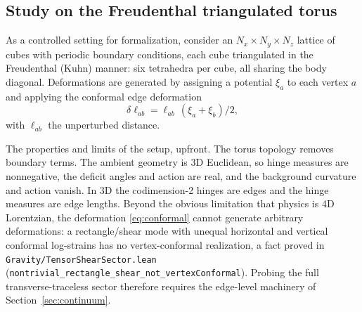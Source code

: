 \documentclass[11pt,letterpaper]{article}
\newcommand{\lean}[1]{\texttt{#1}}
\begin{document}
\subsection{Study on the Freudenthal triangulated torus}
\label{sec:torus}

As a controlled setting for formalization, consider an $N_{x}\times N_{y}\times N_{z}$ lattice of cubes with periodic boundary conditions, each cube triangulated in the Freudenthal (Kuhn) manner: six tetrahedra per cube, all sharing the body diagonal. Deformations are generated by assigning a potential $\xi_{a}$ to each vertex $a$ and applying the conformal edge deformation
\begin{equation}
\delta\ell_{ab}=\ell_{ab}\,(\xi_{a}+\xi_{b})/2,
\label{eq:conformal}
\end{equation}
with $\ell_{ab}$ the unperturbed distance.

The properties and limits of the setup, upfront. The torus topology removes boundary terms. The ambient geometry is 3D Euclidean, so hinge measures are nonnegative, the deficit angles and action are real, and the background curvature and action vanish. In 3D the codimension-2 hinges are edges and the hinge measures are edge lengths. Beyond the obvious limitation that physics is 4D Lorentzian, the deformation \eqref{eq:conformal} cannot generate arbitrary deformations: a rectangle/shear mode with unequal horizontal and vertical conformal log-strains has no vertex-conformal realization, a fact proved in \lean{Gravity/TensorShearSector.lean} (\lean{nontrivial\_rectangle\_shear\_not\_vertexConformal}). Probing the full transverse-traceless sector therefore requires the edge-level machinery of Section~\ref{sec:continuum}.
\end{document}
